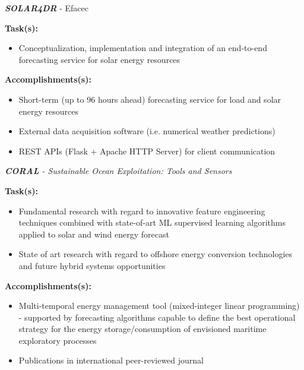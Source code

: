 \documentclass{mycv}
\begin{document}
\begin{myitemize}	
	\item \textit{\textbf{SOLAR4DR}} - Efacec
	
		\vspace{0.15cm}
		\textbf{Task(s):}
		
		\begin{itemize}[itemsep=1px]
			\item Conceptualization, implementation and integration of an end-to-end forecasting service for solar energy resources
		\end{itemize}
	
		\vspace{0.15cm}
		\textbf{Accomplishments(s):}
		
		\begin{itemize}[itemsep=1px]
			\item Short-term (up to 96 hours ahead) forecasting service for load and solar energy resources
			\item External data acquisition software (i.e. numerical weather predictions)
			\item REST APIs (Flask + Apache HTTP Server) for client communication
		\end{itemize}
	
	
	\vspace{0.3cm}	

	\item \textit{\textbf{CORAL} - Sustainable Ocean Exploitation: Tools and Sensors}

		\vspace{0.15cm}
		\textbf{Task(s):}

		\begin{itemize}[itemsep=1px]
			\item Fundamental research with regard to innovative feature engineering techniques combined with state-of-art ML supervised learning algorithms applied to solar and wind energy forecast
			\item State of art research with regard to offshore energy conversion technologies and future hybrid systems opportunities
		\end{itemize}
		
		\vspace{0.15cm}
		\textbf{Accomplishments(s):}
		
		\begin{itemize}[itemsep=1px]
			\item Multi-temporal energy management tool (mixed-integer linear programming) - supported by forecasting algorithms capable to define the best operational strategy for the energy storage/consumption of envisioned maritime exploratory processes
			\item Publications in international peer-reviewed journal
		\end{itemize}
		


		
\end{myitemize}
\pagebreak
\end{document}
